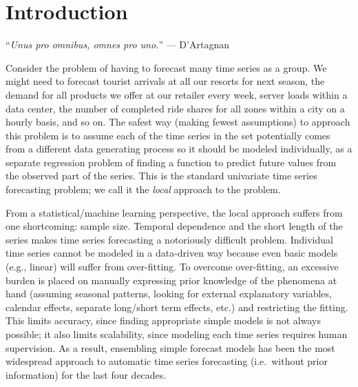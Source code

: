 \documentclass[a4paper]{article}
\theoremstyle{custom}
\begin{document}
\begin{abstract}
%

\end{abstract}


\section{Introduction}
\label{sec:intro}

``\textit{Unus pro omnibus, omnes pro uno.}'' --- D'Artagnan

Consider the problem of having to forecast many time series as a group.
We might need to forecast tourist arrivals at all our resorts for next season, the demand for all products we offer at our retailer every week, server loads within a data center, the number of completed ride shares for all zones within a city on a hourly basis, and so on.
The safest way (making fewest assumptions) to approach this problem is to assume each of the time series in the set potentially comes from a different data generating process so it should be modeled individually, as a separate regression problem of finding a function to predict future values from the observed part of the series. This is the standard univariate time series forecasting problem; we call it the \textit{local} approach to the problem.

From a statistical/machine learning perspective, the local approach suffers from one shortcoming: sample size.
Temporal dependence and the short length of the series makes time series forecasting a notoriously difficult problem. Individual time series cannot be modeled in a data-driven way because even basic models (e.g., linear) will suffer from over-fitting.
To overcome over-fitting, an excessive burden is placed on manually expressing prior knowledge of the phenomena at hand (assuming seasonal patterns, looking for external explanatory variables, calendar effects, separate long/short term effects, etc.) and restricting the fitting.
This limits accuracy, since finding appropriate simple models is not always possible; it also limits scalability, since modeling each time series requires human supervision.
As a result, ensembling simple forecast models has been the most widespread approach to automatic time series forecasting (i.e.\ without prior information) for the last four decades.
\end{document}
